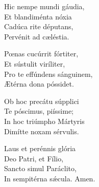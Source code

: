 Hic nempe mundi gáudia,\\
Et blandiménta nóxia\\
Cadúca rite députans,\\
Pervénit ad cæléstia.

Pœnas cucúrrit fórtiter,\\
Et sústulit viríliter,\\
Pro te effúndens sánguinem,\\
Ætérna dona póssidet.

Ob hoc precátu súpplici\\
Te póscimus, piíssime;\\
In hoc triúmpho Mártyris\\
Dimítte noxam sérvulis.

Laus et perénnis glória\\
Deo Patri, et Fílio,\\
San\-cto simul Paráclito,\\
In sempitérna sǽcula.
Amen.